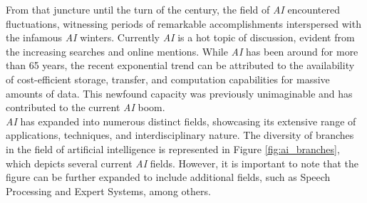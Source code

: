 From that juncture until the turn of the century, the field of \textit{AI}
encountered fluctuations, witnessing periods of remarkable accomplishments
interspersed with the infamous \textit{AI} winters. Currently \textit{AI} is a
hot topic of discussion, evident from the increasing searches and online
mentions. While \textit{AI} has been around for more than 65 years, the recent
exponential trend can be attributed to the availability of cost-efficient
storage, transfer, and computation capabilities for massive amounts of data.
This newfound capacity was previously unimaginable and has contributed to the
current \textit{AI} boom. \\

\textit{AI} has expanded into numerous distinct fields, showcasing its
extensive range of applications, techniques, and interdisciplinary nature. The
diversity of branches in the field of artificial intelligence is represented in
Figure \ref{fig:ai_branches}, which depicts several current
\textit{AI} fields. However, it is important to note that the figure can be
further expanded to include additional fields, such as Speech Processing and
Expert Systems, among others.

